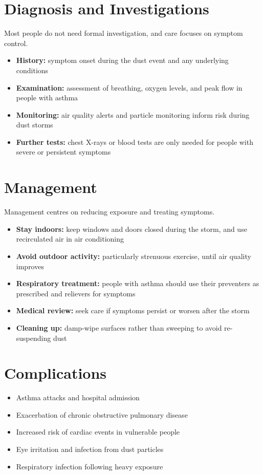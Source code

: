 \section*{Diagnosis and Investigations}
Most people do not need formal investigation, and care focuses on symptom control.
\begin{itemize}
    \item \textbf{History:} symptom onset during the dust event and any underlying conditions
    \item \textbf{Examination:} assessment of breathing, oxygen levels, and peak flow in people with asthma
    \item \textbf{Monitoring:} air quality alerts and particle monitoring inform risk during dust storms
    \item \textbf{Further tests:} chest X-rays or blood tests are only needed for people with severe or persistent symptoms
\end{itemize}

\section*{Management}
Management centres on reducing exposure and treating symptoms.
\begin{itemize}
    \item \textbf{Stay indoors:} keep windows and doors closed during the storm, and use recirculated air in air conditioning
    \item \textbf{Avoid outdoor activity:} particularly strenuous exercise, until air quality improves
    \item \textbf{Respiratory treatment:} people with asthma should use their preventers as prescribed and relievers for symptoms
    \item \textbf{Medical review:} seek care if symptoms persist or worsen after the storm
    \item \textbf{Cleaning up:} damp-wipe surfaces rather than sweeping to avoid re-suspending dust
\end{itemize}

\section*{Complications}
\begin{itemize}
    \item Asthma attacks and hospital admission
    \item Exacerbation of chronic obstructive pulmonary disease
    \item Increased risk of cardiac events in vulnerable people
    \item Eye irritation and infection from dust particles
    \item Respiratory infection following heavy exposure
\end{itemize}

